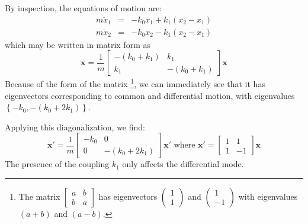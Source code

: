 By inspection, the equations of motion are:
\begin{eqnarray}
m\ddot{x}_{1} & = & -k_{0}x_{1}+k_{1}(x_{2}-x_{1})\\
m\ddot{x}_{2} & = & -k_{0}x_{2}-k_{1}(x_{2}-x_{1})
\end{eqnarray}
which may be written in matrix form as
\begin{equation}
\mathbf{\ddot{x}}=\frac{1}{m}\left[\begin{array}{cc}
-(k_{0}+k_{1}) & k_{1}\\
k_{1} & -(k_{0}+k_{1})
\end{array}\right]\mathbf{x}
\end{equation}
Because of the form of the matrix%
\footnote{The matrix $\left[\begin{array}{cc}
a & b\\
b & a
\end{array}\right]$ has eigenvectors $\left(\begin{array}{c}
1\\
1
\end{array}\right)$ and $\left(\begin{array}{c}
1\\
-1
\end{array}\right)$ with eigenvalues $(a+b)$ and $(a-b)$.%
}, we can immediately see that it has eigenvectors corresponding to
common and differential motion, with eigenvalues $\left\{ -k_{0},-(k_{0}+2k_{1})\right\} $. 

Applying this diagonalization, we find:
\[
\mathbf{\ddot{x'}}=\frac{1}{m}\left[\begin{array}{cc}
-k_{0} & 0\\
0 & -(k_{0}+2k_{1})
\end{array}\right]\mathbf{x'}\text{ where }\mathbf{x'}=\left[\begin{array}{cc}
1 & 1\\
1 & -1
\end{array}\right]\mathbf{x}
\]
The presence of the coupling $k_{1}$ only affects the differential
mode.





